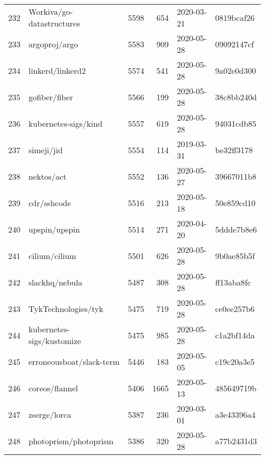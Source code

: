 \begin{footnotesize}
\begin{longtable}{llrrll}
        232 &                          Workiva/go-datastructures &   5598 &    654 & 2020-03-21 &  0819bcaf26 \\
        233 &                                      argoproj/argo &   5583 &    909 & 2020-05-28 &  09092147cf \\
        234 &                                   linkerd/linkerd2 &   5574 &    541 & 2020-05-28 &  9a02e0d300 \\
        235 &                                      gofiber/fiber &   5566 &    199 & 2020-05-28 &  38c8bb240d \\
        236 &                               kubernetes-sigs/kind &   5557 &    619 & 2020-05-28 &  94031cdb85 \\
        237 &                                         simeji/jid &   5554 &    114 & 2019-03-31 &  be32ff3178 \\
        238 &                                         nektos/act &   5552 &    136 & 2020-05-27 &  39667011b8 \\
        239 &                                        cdr/sshcode &   5516 &    213 & 2020-05-18 &  50e859cd10 \\
        240 &                                      upspin/upspin &   5514 &    271 & 2020-04-20 &  5ddde7b8e6 \\
        241 &                                      cilium/cilium &   5501 &    626 & 2020-05-28 &  9b0ae85b5f \\
        242 &                                     slackhq/nebula &   5487 &    308 & 2020-05-28 &  ff13aba8fc \\
        243 &                                TykTechnologies/tyk &   5475 &    719 & 2020-05-28 &  ce0ee257b6 \\
        244 &                          kubernetes-sigs/kustomize &   5475 &    985 & 2020-05-28 &  c1a2bf14da \\
        245 &                           erroneousboat/slack-term &   5446 &    183 & 2020-05-05 &  c19c20a3e5 \\
        246 &                                     coreos/flannel &   5406 &   1665 & 2020-05-13 &  485649719b \\
        247 &                                       zserge/lorca &   5387 &    236 & 2020-03-01 &  a3e43396a4 \\
        248 &                              photoprism/photoprism &   5386 &    320 & 2020-05-28 &  a77b2431d3 \\

\end{longtable}
\end{footnotesize}
